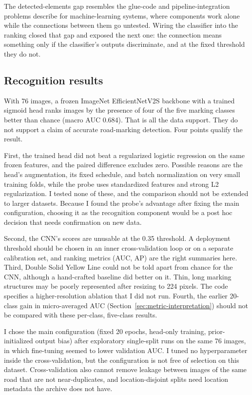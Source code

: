 \documentclass[11pt]{article}
\begin{document}
The detected-elements gap resembles the glue-code and pipeline-integration problems \citet{sculley2015} describe for machine-learning systems, where components work alone while the connections between them go untested. Wiring the classifier into the ranking closed that gap and exposed the next one: the connection means something only if the classifier's outputs discriminate, and at the fixed threshold they do not.

\subsection{Recognition results}
With 76 images, a frozen ImageNet EfficientNetV2S backbone with a trained sigmoid head ranks images by the presence of four of the five marking classes better than chance (macro AUC 0.684). That is all the data support. They do not support a claim of accurate road-marking detection. Four points qualify the result.

First, the trained head did not beat a regularized logistic regression on the same frozen features, and the paired difference excludes zero. Possible reasons are the head's augmentation, its fixed schedule, and batch normalization on very small training folds, while the probe uses standardized features and strong L2 regularization. I tested none of these, and the comparison should not be extended to larger datasets. Because I found the probe's advantage after fixing the main configuration, choosing it as the recognition component would be a post hoc decision that needs confirmation on new data.

Second, the CNN's scores are unusable at the 0.35 threshold. A deployment threshold should be chosen in an inner cross-validation loop or on a separate calibration set, and ranking metrics (AUC, AP) are the right summaries here. Third, Double Solid Yellow Line could not be told apart from chance for the CNN, although a hand-crafted baseline did better on it. Thin, long marking structures may be poorly represented after resizing to 224 pixels. The code specifies a higher-resolution ablation that I did not run. Fourth, the earlier 20-class gain in micro-averaged AUC (Section~\ref{sec:metric-interpretation}) should not be compared with these per-class, five-class results.

I chose the main configuration (fixed 20 epochs, head-only training, prior-initialized output bias) after exploratory single-split runs on the same 76 images, in which fine-tuning seemed to lower validation AUC. I tuned no hyperparameter inside the cross-validation, but the configuration is not free of selection on this dataset. Cross-validation also cannot remove leakage between images of the same road that are not near-duplicates, and location-disjoint splits need location metadata the archive does not have.
\end{document}

